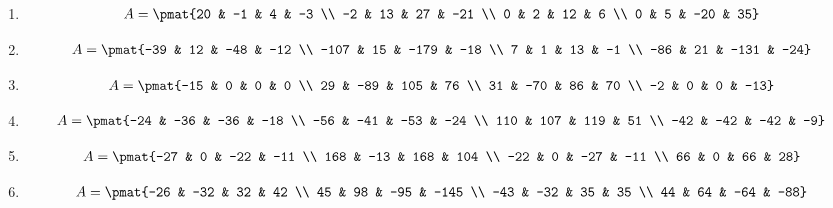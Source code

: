 \begin{enumerate}
\item

\begin{align*}
A = \pmat{20 & -1 & 4 & -3 \\ -2 & 13 & 27 & -21 \\ 0 & 2 & 12 & 6 \\ 0 & 5 & -20 & 35}
\end{align*}

\item

\begin{align*}
A = \pmat{-39 & 12 & -48 & -12 \\ -107 & 15 & -179 & -18 \\ 7 & 1 & 13 & -1 \\ -86 & 21 & -131 & -24}
\end{align*}

\item

\begin{align*}
A = \pmat{-15 & 0 & 0 & 0 \\ 29 & -89 & 105 & 76 \\ 31 & -70 & 86 & 70 \\ -2 & 0 & 0 & -13}
\end{align*}

\item

\begin{align*}
A = \pmat{-24 & -36 & -36 & -18 \\ -56 & -41 & -53 & -24 \\ 110 & 107 & 119 & 51 \\ -42 & -42 & -42 & -9}
\end{align*}

\item

\begin{align*}
A = \pmat{-27 & 0 & -22 & -11 \\ 168 & -13 & 168 & 104 \\ -22 & 0 & -27 & -11 \\ 66 & 0 & 66 & 28}
\end{align*}

\item

\begin{align*}
A = \pmat{-26 & -32 & 32 & 42 \\ 45 & 98 & -95 & -145 \\ -43 & -32 & 35 & 35 \\ 44 & 64 & -64 & -88}
\end{align*}


\end{enumerate}
